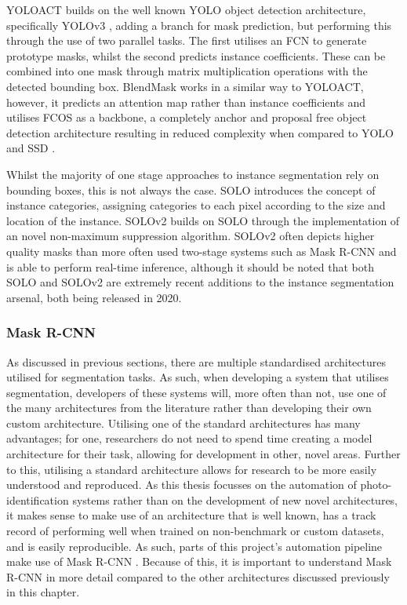YOLOACT \cite{bolya_190402689_2019} builds on the well known YOLO object detection architecture, specifically YOLOv3 \cite{redmon_yolov3_2018}, adding a branch for mask prediction, but performing this through the use of two parallel tasks. The first utilises an FCN to generate prototype masks, whilst the second predicts instance coefficients. These can be combined into one mask through matrix multiplication operations with the detected bounding box. BlendMask \cite{chen_blendmask_2020} works in a similar way to YOLOACT, however, it predicts an attention map rather than instance coefficients and utilises FCOS \cite{tian_fcos_2019} as a backbone, a completely anchor and proposal free object detection architecture resulting in reduced complexity when compared to YOLO \cite{redmon_you_2016} and SSD \cite{liu_ssd:_2016}. 

Whilst the majority of one stage approaches to instance segmentation rely on bounding boxes, this is not always the case. SOLO \cite{wang_solo_2020} introduces the concept of instance categories, assigning categories to each pixel according to the size and location of the instance. SOLOv2 \cite{wang_solov2_2020} builds on SOLO through the implementation of an novel non-maximum suppression algorithm. SOLOv2 often depicts higher quality masks than more often used two-stage systems such as Mask R-CNN and is able to perform real-time inference, although it should be noted that both SOLO and SOLOv2 are extremely recent additions to the instance segmentation arsenal, both being released in 2020. 

\subsubsection{Mask R-CNN}\label{ch:Background,sec:instanceSegmentation,sub:Mask R-CNN}

As discussed in previous sections, there are multiple standardised architectures utilised for segmentation tasks. As such, when developing a system that utilises segmentation, developers of these systems will, more often than not, use one of the many architectures from the literature rather than developing their own custom architecture. Utilising one of the standard architectures has many advantages; for one, researchers do not need to spend time creating a model architecture for their task, allowing for development in other, novel areas. Further to this, utilising a standard architecture allows for research to be more easily understood and reproduced. As this thesis focusses on the automation of photo-identification systems rather than on the development of new novel architectures, it makes sense to make use of an architecture that is well known, has a track record of performing well when trained on non-benchmark or custom datasets, and is easily reproducible. As such, parts of this project's automation pipeline make use of Mask R-CNN \cite{he_mask_2017}. Because of this, it is important to understand Mask R-CNN in more detail compared to the other architectures discussed previously in this chapter. 

